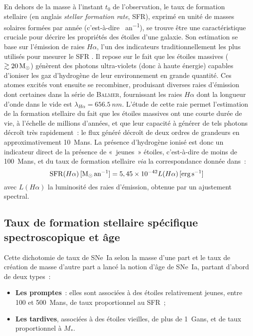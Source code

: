 \documentclass[../main/main.tex]{subfiles}
\begin{document}
En dehors de la masse à l'instant $t_0$ de l'observation, le taux de formation
stellaire (en anglais \textit{stellar formation rate}, SFR), exprimé en unité de
masses solaires formées par année (c'est-à-dire \si{\Msun.an^{-1}}), se trouve
être une caractéristique cruciale pour décrire les propriétés des étoiles d'une
galaxie. Son estimation se base sur l'émission de raies $H\alpha$, l'un des
indicateurs traditionnellement les plus utilisés pour mesurer le SFR
\citep{kennicutt1998}. Il repose sur le fait que les étoiles massives ($\gtrsim
\SI{20}{\Msun}$) génèrent des photons ultra-violets (donc à haute énergie)
capables d'ioniser les gaz d'hydrogène de leur environnement
\citep{calzetti2013} en grande quantité. Ces atomes excités vont ensuite se
recombiner, produisant diverses raies d'émission dont certaines dans la série de
\textsc{Balmer}, fournissant les raies $H\alpha$ dont la longueur d'onde dans le
vide est $\lambda_{H\alpha} = \SI{656.5}{nm}$. L'étude de cette raie
permet l'estimation de la formation stellaire du fait que les étoiles massives
ont une courte durée de vie, à l'échelle de millions d'années, et que leur
capacité à générer de tels photons décroît très rapidement~: le flux généré
décroît de deux ordres de grandeurs en approximativement \SI{10}{Mans}. La
présence d'hydrogène ionisé est donc un indicateur direct de la présence de
«~jeunes~» étoiles, c'est-à-dire de moins de \SI{100}{Mans}, et du taux de
formation stellaire \textit{via} la correspondance donnée
dans~\cite{calzetti2013}:
\begin{equation}\label{eq:sfrha}
    \mathrm{SFR}(H\alpha)\,[\si{\Msun.an^{-1}}] =
    5,45\times 10^{-42}L(H\a)\,[\si{erg.s^{-1}}]
\end{equation}
avec $L(H\alpha)$ la luminosité des raies d'émission, obtenue par un
ajustement spectral.

\subsection{Taux de formation stellaire spécifique
spectroscopique et âge}\label{ssec:lssfr}

Cette dichotomie de taux de SNe~Ia selon la masse d'une part et le taux de création de
masse d'autre part a lancé la notion d'âge de SNe~Ia, partant d'abord de deux
types~:
\begin{itemize}
    \item \textbf{Les promptes}~: elles sont associées à des étoiles
        relativement jeunes, entre \num{100} et \SI{500}{Mans}, de taux
        proportionnel au SFR~;
    \item \textbf{Les tardives}, associées à des étoiles vieilles, de plus de
        \SI{1}{Gans}, et de taux proportionnel à $M_*$.
\end{itemize}
\end{document}
